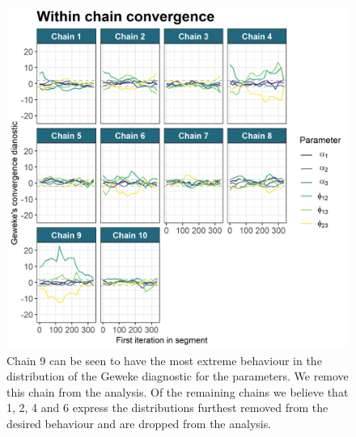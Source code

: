 \documentclass[]{article}
\begin{document}
\begin{figure}
	\centering
	\includegraphics[scale=0.8]{./Images/Yeast/Convergence/gewekePlot.png}
	\caption{Chain 9 can be seen to have the most extreme behaviour in the distribution of the Geweke diagnostic for the parameters. We remove this chain from the analysis. Of the remaining chains we believe that 1, 2, 4 and 6 express the distributions furthest removed from the desired behaviour and are dropped from the analysis.}
	\label{fig:gewekePlot}
\end{figure}
\end{document}

